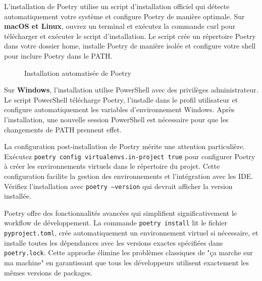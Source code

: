 L'installation de Poetry utilise un script d'installation officiel qui détecte automatiquement votre système et configure Poetry de manière optimale. Sur \textbf{macOS et Linux}, ouvrez un terminal et exécutez la commande curl pour télécharger et exécuter le script d'installation. Le script crée un répertoire Poetry dans votre dossier home, installe Poetry de manière isolée et configure votre shell pour inclure Poetry dans le PATH.

\begin{figure}[H]
\centering
{}
\caption{Installation automatisée de Poetry}
\end{figure}

Sur \textbf{Windows}, l'installation utilise PowerShell avec des privilèges administrateur. Le script PowerShell télécharge Poetry, l'installe dans le profil utilisateur et configure automatiquement les variables d'environnement Windows. Après l'installation, une nouvelle session PowerShell est nécessaire pour que les changements de PATH prennent effet.

La configuration post-installation de Poetry mérite une attention particulière. Exécutez \texttt{poetry config virtualenvs.in-project true} pour configurer Poetry à créer les environnements virtuels dans le répertoire du projet. Cette configuration facilite la gestion des environnements et l'intégration avec les IDE. Vérifiez l'installation avec \texttt{poetry --version} qui devrait afficher la version installée.

Poetry offre des fonctionnalités avancées qui simplifient significativement le workflow de développement. La commande \texttt{poetry install} lit le fichier \texttt{pyproject.toml}, crée automatiquement un environnement virtuel si nécessaire, et installe toutes les dépendances avec les versions exactes spécifiées dans \texttt{poetry.lock}. Cette approche élimine les problèmes classiques de "ça marche sur ma machine" en garantissant que tous les développeurs utilisent exactement les mêmes versions de packages.

